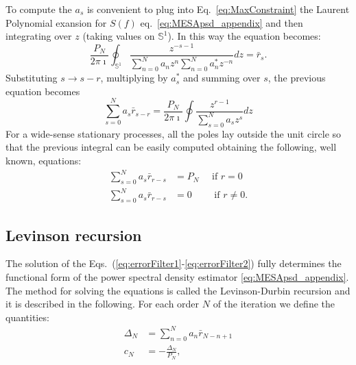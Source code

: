 \documentclass[epj,nopacs]{svjour}
\begin{document}
\begin{appendix}
To compute the $a_s$ is convenient to plug into Eq.~\eqref{eq:MaxConstraint} the Laurent Polynomial exansion for $S(f)$ eq.~\eqref{eq:MESApsd_appendix} and then integrating over $z$ (taking values on ${\mathbb S^1}$). In this way the equation becomes:
\begin{equation}
    \label{eq:contourintegral}
   \frac{P_N}{2 \pi \imath} \oint _{\mathbb S^1}\frac{z^{-s - 1}}{\sum_{n = 0}^N a_n z^n \sum_{n = 0}^N a^*_n z^{-n}}dz = \bar r_s. 
\end{equation}
Substituting $s \to s - r$, multiplying by $a^*_s$ and summing over $s$, the previous equation becomes 
\begin{equation}
    \label{eq:errorFilter}
    \sum_{s = 0}^N a_s \bar r_{s - r} = \frac{P_N}{2 \pi \imath}\oint \frac{z^{r -1}}{\sum_{s = 0}^N a_s z^s}dz
\end{equation}
For a wide-sense stationary processes, all the poles lay outside the unit circle so that the previous integral can be easily computed obtaining the following, well known, equations: 
\begin{align}
    \label{eq:errorFilter1}
    \sum_{s = 0}^N a_s \bar r_{r - s} &= P_N \quad \text{ if } r = 0 \\ \label{eq:errorFilter2}
    \sum_{s = 0}^N a_s \bar r_{r - s} & = 0 \qquad \text{ if } r \neq 0.
\end{align}

\subsection{Levinson recursion} \label{sec:LevinsonRecursion}
The solution of the Eqs.~(\ref{eq:errorFilter1}-\ref{eq:errorFilter2}) fully determines the functional form of the power spectral density estimator \eqref{eq:MESApsd_appendix}.
The method for solving the equations is called the Levinson-Durbin recursion \cite{doi:10.1002/sapm1946251261} and it is described in the following.
For each order $N$ of the iteration we define the quantities:
\begin{align}
\Delta_N &= \sum_{n = 0}^{N} a_n \bar{r}_{N - n + 1} \\ 
c_N &= - \frac{\Delta_N}{P_N},
\end{align}


\end{appendix}
\end{document}
